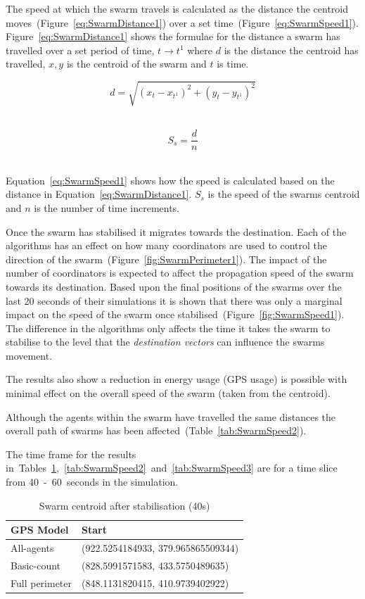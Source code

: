 \documentclass{ieeeaccess}
\begin{document}
The speed at which the swarm travels is calculated as the distance the centroid moves~(Figure~\ref{eq:SwarmDistance1}) over a set time~(Figure~\ref{eq:SwarmSpeed1}). Figure~\ref{eq:SwarmDistance1} shows the formulae for the distance a swarm has travelled over a set period of time, $t \rightarrow t^{1}$ where $d$ is the distance the centroid has travelled, $x,y$ is the centroid of the swarm and $t$ is time.

\begin{equation}\label{eq:SwarmDistance1}
d = \sqrt{(x_{t}-x_{t^1})^2+(y_{t}-y_{t^1})^2}
\end{equation}‎

\begin{equation}\label{eq:SwarmSpeed1}
S_s = \frac{d}{n}
\end{equation}‎

Equation~\ref{eq:SwarmSpeed1} shows how the speed is calculated based on the distance in Equation~\ref{eq:SwarmDistance1}. $S_s$ is the speed of the swarms centroid and $n$ is the number of time increments.

Once the swarm has stabilised it migrates towards the destination. Each of the algorithms has an effect on how many coordinators are used to control the direction of the swarm~(Figure~\ref{fig:SwarmPerimeter1}). The impact of the number of coordinators is expected to affect the propagation speed of the swarm towards its destination. Based upon the final positions of the swarms over the last 20 seconds of their simulations it is shown that there was only a marginal impact on the speed of the swarm once stabilised~(Figure~\ref{fig:SwarmSpeed1}). The difference in the algorithms only affects the time it takes the swarm to stabilise to the level that the \textit{destination vectors} can influence the swarms movement.

The results also show a reduction in energy usage (GPS usage) is possible with minimal effect on the overall speed of the swarm (taken from the centroid). 

Although the agents within the swarm have travelled the same distances the overall path of swarms has been affected~(Table~\ref{tab:SwarmSpeed2}).

The time frame for the results in~Tables~\ref{tab:SwarmSpeed1},~\ref{tab:SwarmSpeed2}~and~\ref{tab:SwarmSpeed3} are for a time slice from 40~-~60~seconds in the simulation.

\begin{table}
\begin{center}
\begin{tabular}{| l | l |}
\hline
GPS Model & Start \\ \hline
All-agents & (922.5254184933, 379.965865509344) \\ \hline
Basic-count & (828.5991571583, 433.5750489635) \\ \hline
Full perimeter & (848.1131820415, 410.9739402922) \\ \hline
\end{tabular}\caption{Swarm centroid after stabilisation (40s)} \label{tab:SwarmSpeed1}
\end{center}
\end{table}
\end{document}
